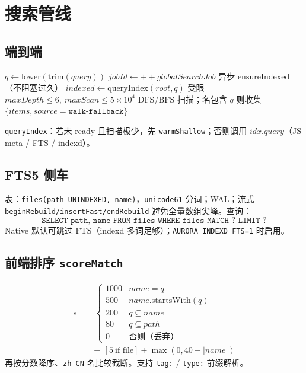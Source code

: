 \documentclass[UTF8,a4paper,11pt]{ctexart}
\begin{document}
\section{搜索管线}

\subsection{端到端}
\begin{algorithm}[htbp]
\caption{searchFiles$(root, query, opts)$}
$q \leftarrow \mathrm{lower}(\mathrm{trim}(query))$\;
$jobId \leftarrow ++globalSearchJob$\; 
异步 $\mathrm{ensureIndexed}$（不阻塞过久）\;
$indexed \leftarrow \mathrm{queryIndex}(root, q)$\;
\BlankLine
{}
受限 $maxDepth\le 6,\ maxScan\le 5\times 10^4$\;
DFS/BFS 扫描；名包含 $q$ 则收集\;
\Return $\{items, source=\texttt{walk-fallback}\}$\;
\end{algorithm}

\texttt{queryIndex}：若未 ready 且扫描极少，先 \texttt{warmShallow}；否则调用 $idx.query$（JS meta / FTS / indexd）。

\subsection{FTS5 侧车}
表：\texttt{files(path UNINDEXED, name)}，\texttt{unicode61} 分词；WAL；流式 \texttt{beginRebuild/insertFast/endRebuild} 避免全量数组尖峰。查询：
\[
\texttt{SELECT path, name FROM files WHERE files MATCH ? LIMIT ?}
\]
Native 默认可跳过 FTS（indexd 多词足够）；\texttt{AURORA\_INDEXD\_FTS=1} 时启用。

\subsection{前端排序 \texttt{scoreMatch}}
\begin{align*}
s &=
\begin{cases}
1000 & name = q \\
500 & name.\mathrm{startsWith}(q) \\
200 & q \subseteq name \\
80 & q \subseteq path \\
0 & \text{否则（丢弃）}
\end{cases}
\\
&\quad +\, [5\ \text{if file}] + \max(0, 40-|name|)
\end{align*}
再按分数降序、\texttt{zh-CN} 名比较截断。支持 \texttt{tag:} / \texttt{type:} 前缀解析。
\end{document}
